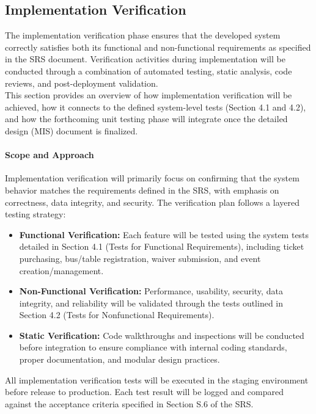 \documentclass[12pt, titlepage]{article}
\begin{document}
\subsection{Implementation Verification}

The implementation verification phase ensures that the developed system correctly satisfies both its functional and non-functional requirements as specified in the SRS document. Verification activities during implementation will be conducted through a combination of automated testing, static analysis, code reviews, and post-deployment validation.\\
\noindent \newline This section provides an overview of how implementation verification will be achieved, how it connects to the defined system-level tests (Section 4.1 and 4.2), and how the forthcoming unit testing phase will integrate once the detailed design (MIS) document is finalized.

\paragraph{Scope and Approach}
\noindent \newline
\noindent Implementation verification will primarily focus on confirming that the system behavior matches the requirements defined in the SRS, with emphasis on correctness, data integrity, and security. The verification plan follows a layered testing strategy:

\begin{itemize}
    \item \textbf{Functional Verification:} Each feature will be tested using the system tests detailed in Section 4.1 (Tests for Functional Requirements), including ticket purchasing, bus/table registration, waiver submission, and event creation/management.
    \item \textbf{Non-Functional Verification:} Performance, usability, security, data integrity, and reliability will be validated through the tests outlined in Section 4.2 (Tests for Nonfunctional Requirements).
    \item \textbf{Static Verification:} Code walkthroughs and inspections will be conducted before integration to ensure compliance with internal coding standards, proper documentation, and modular design practices.
\end{itemize}

\noindent All implementation verification tests will be executed in the staging environment before release to production. Each test result will be logged and compared against the acceptance criteria specified in Section S.6 of the SRS.
\end{document}
